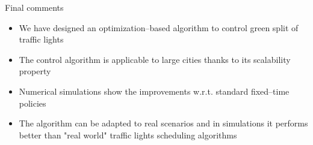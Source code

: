 \begin{frame}{Final comments}
    \begin{itemize}
    \item We have designed an optimization--based algorithm to control green split of traffic lights
    \item The control algorithm is applicable to large cities thanks to its scalability property
    \item Numerical simulations show the improvements w.r.t. standard fixed--time policies
    \item The algorithm can be adapted to real scenarios and in simulations it performs better than "real world" traffic lights scheduling algorithms
    \end{itemize}
\end{frame}
